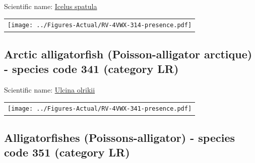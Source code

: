 \documentclass[12pt]{article}\usepackage[]{graphicx}\usepackage[]{color}
\begin{document}
  


Scientific name: \href{http://www.marinespecies.org/aphia.php?p=taxdetails\&id=127200}{Icelus spatula} \newline
\begin{minipage}{1.0\textwidth}
 \begin{tabular}{c}
\texttt{[image: ../Figures-Actual/RV-4VWX-314-presence.pdf]} \\ 
\end{tabular} 
\end{minipage}
\clearpage

\renewcommand\thefigure{\thesubsection\Alph{figure}}

\setcounter{figure}{0}

\hypertarget{sec:341}{%
\subsection{Arctic alligatorfish (Poisson-alligator arctique) - species code 341 (category LR)}\label{sec:341}}

  


Scientific name: \href{http://www.marinespecies.org/aphia.php?p=taxdetails\&id=274356}{Ulcina olrikii} \newline
\begin{minipage}{1.0\textwidth}
 \begin{tabular}{c}
\texttt{[image: ../Figures-Actual/RV-4VWX-341-presence.pdf]} \\ 
\end{tabular} 
\end{minipage}
\clearpage

\renewcommand\thefigure{\thesubsection\Alph{figure}}

\setcounter{figure}{0}

\hypertarget{sec:351}{%
\subsection{Alligatorfishes (Poissons-alligator) - species code 351 (category LR)}\label{sec:351}}

  
\end{document}
